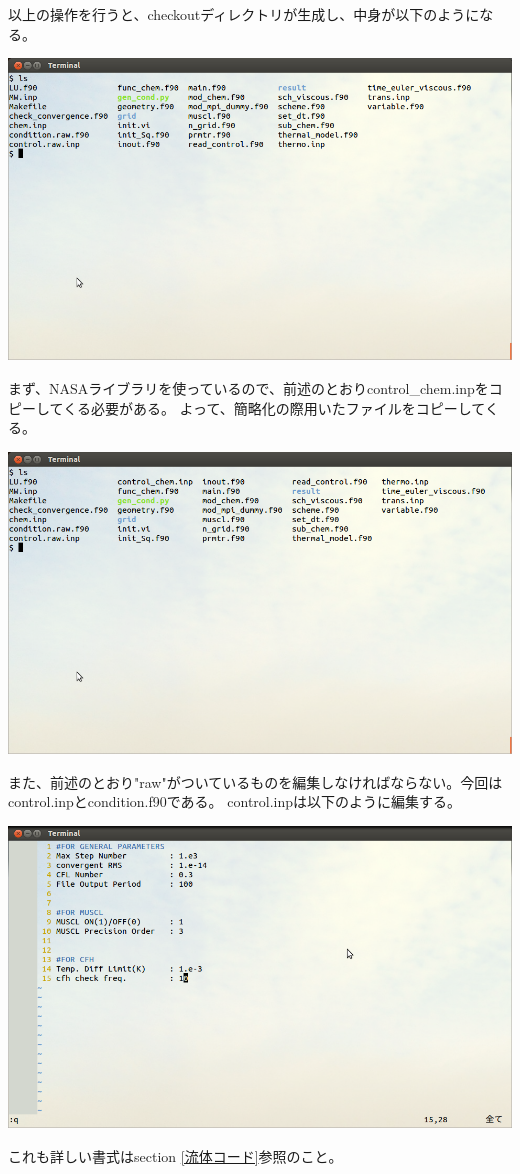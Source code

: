 \documentclass{jsarticle}
\begin{document}
以上の操作を行うと、checkoutディレクトリが生成し、中身が以下のようになる。
\begin{center}
\includegraphics[width=.8\textwidth,bb=0 0 962 577]{tutorial_img/170.png}
\end{center}
まず、NASAライブラリを使っているので、前述のとおりcontrol\_chem.inpをコピーしてくる必要がある。
よって、簡略化の際用いたファイルをコピーしてくる。
\begin{center}
\includegraphics[width=.8\textwidth,bb=0 0 962 577]{tutorial_img/180.png}
\end{center}
また、前述のとおり"raw"がついているものを編集しなければならない。今回はcontrol.inpとcondition.f90である。
control.inpは以下のように編集する。
\begin{center}
\includegraphics[width=.8\textwidth,bb=0 0 962 577]{tutorial_img/190.png}
\end{center}
これも詳しい書式はsection \ref{流体コード}参照のこと。
\end{document}

